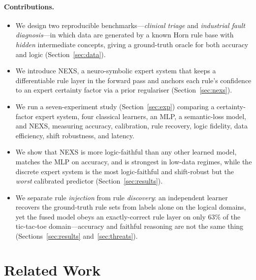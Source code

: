 \documentclass[11pt]{article}
\newcommand{\nexs}{\textsc{NEXS}}
\begin{document}
\paragraph{Contributions.}
\begin{itemize}
  \item We design two reproducible benchmarks---\emph{clinical triage} and
  \emph{industrial fault diagnosis}---in which data are generated by a known Horn
  rule base with \emph{hidden} intermediate concepts, giving a ground-truth oracle
  for both accuracy and logic (Section~\ref{sec:data}).
  \item We introduce \nexs{}, a neuro-symbolic expert system that keeps a
  differentiable rule layer in the forward pass and anchors each rule's confidence
  to an expert certainty factor via a prior regulariser (Section~\ref{sec:nexs}).
  \item We run a seven-experiment study (Section~\ref{sec:exp}) comparing a
  certainty-factor expert system, four classical learners, an MLP, a semantic-loss
  model, and \nexs{}, measuring accuracy, calibration, rule recovery, logic
  fidelity, data efficiency, shift robustness, and latency.
  \item We show that \nexs{} is more logic-faithful than any other learned model,
  matches the MLP on accuracy, and is strongest in low-data regimes, while the
  discrete expert system is the most logic-faithful and shift-robust but the
  \emph{worst} calibrated predictor (Section~\ref{sec:results}).
  \item We separate rule \emph{injection} from rule \emph{discovery}: an
  independent learner recovers the ground-truth rule sets from labels alone on
  the logical domains, yet the fused model obeys an exactly-correct rule layer on
  only $63\%$ of the tic-tac-toe domain---accuracy and faithful reasoning are not
  the same thing (Sections~\ref{sec:results} and~\ref{sec:threats}).
\end{itemize}

\section{Related Work}
\label{sec:related}
\end{document}

